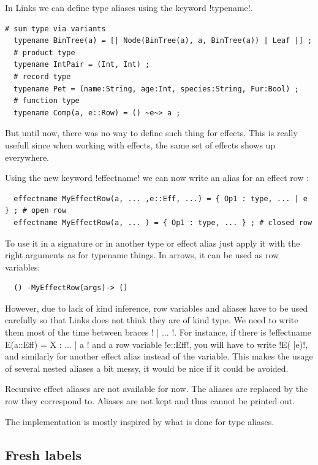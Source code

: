 \documentclass[11pt, nonacm=true, language=french, language=english]{acmart}
\begin{document}
In Links we can define type aliases using the keyword !typename!.
\begin{lstlisting}[caption=Type alias examples]
  # sum type via variants
  typename BinTree(a) = [| Node(BinTree(a), a, BinTree(a)) | Leaf |] ;
  # product type
  typename IntPair = (Int, Int) ;
  # record type
  typename Pet = (name:String, age:Int, species:String, Fur:Bool) ;
  # function type
  typename Comp(a, e::Row) = () ~e~> a ;
\end{lstlisting}

But until now, there was no way to define such thing for effects. This is really usefull since when working with effects, the same set of effects shows up everywhere.

Using the new keyword !effectname! we can now write an alias for an effect row :
\begin{lstlisting}
  effectname MyEffectRow(a, ... ,e::Eff, ...) = { Op1 : type, ... | e } ; # open row
  effectname MyEffectRow(a, ... ) = { Op1 : type, ... } ; # closed row
\end{lstlisting}

To use it in a signature or in another type or effect alias just apply it with the right arguments as for typename things. In arrows, it can be used as row variables:
\begin{lstlisting}
  () -MyEffectRow(args)-> ()
\end{lstlisting}

However, due to lack of kind inference, row variables and aliases have to be used carefully so that Links does not think they are of kind type. We need to write them most of the time between braces !{ | ... }!. For instance, if there is !effectname E(a::Eff) = {X : ... | a }! and a row variable !e::Eff!, you will have to write !E({ |e})!, and similarly for another effect alias instead of the variable. This makes the usage of several nested aliases a bit messy, it would be nice if it could be avoided.

Recursive effect aliases are not available for now. The aliases are replaced by the row they correspond to. Aliases are not kept and thus cannot be printed out.

The implementation is mostly inspired by what is done for type aliases.

\subsection{Fresh labels}
\label{sec:fresh-labels}
\end{document}
